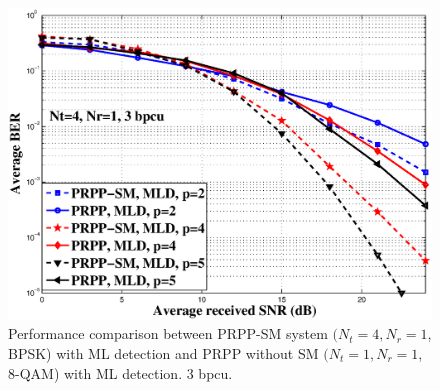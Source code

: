 \documentclass[11pt, onecolumn]{report}
\begin{document}
\begin{figure}[htb]
\centering

\includegraphics[totalheight=9cm,width=12cm]{prppsiso_vs_sm_ml.eps}
\caption{Performance comparison between PRPP-SM system $(N_t=4, N_r=1$, BPSK) with ML detection  and  PRPP without SM $(N_t=1, N_r=1$, 8-QAM) with ML detection. 3 bpcu.}
\label{sisoml}
\end{figure}
\end{document}
